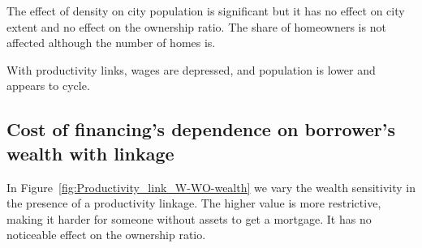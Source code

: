 
The effect of density on city population is significant but it has no effect on city extent and no effect on the ownership ratio. The share of homeowners is not affected although the number of homes is. 


With productivity links, wages are depressed, and population is lower and appears to cycle.
\newpage

\subsection{Cost of financing's dependence on borrower's wealth with linkage}

In Figure~\ref{fig:Productivity_link_W-WO-wealth} %
we vary the wealth sensitivity in the presence of a productivity linkage. The higher value is more restrictive, making it harder for someone without assets to get a mortgage. It has no noticeable effect on the ownership ratio. %


